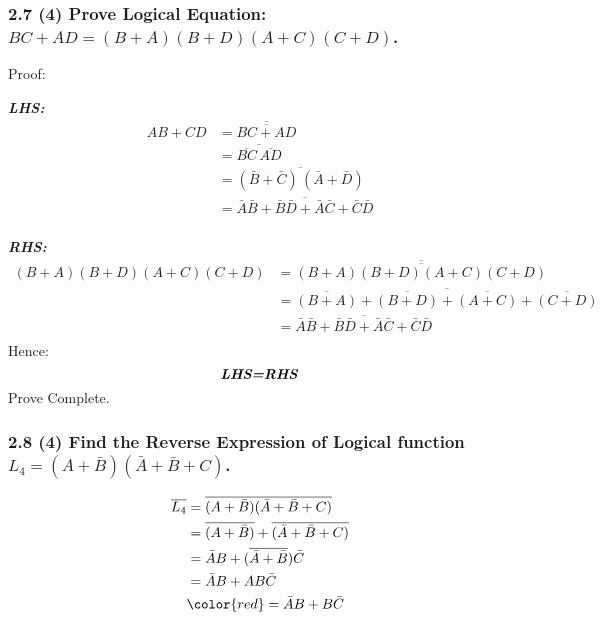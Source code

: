     \subsubsection{2.7 (4) \textnormal{Prove Logical Equation: $BC+AD=(B+A)(B+D)(A+C)(C+D)$}.} 
    {\color{hwSolution}
        \noindent Proof:

        \textbf{\textit{LHS:}}
        \begin{align*}
            AB+CD &= \overline{\overline{BC+AD}}\\
            &= \overline{\overline{BC}\,\overline{AD}}\\
            &= \overline{(\bar{B}+\bar{C})\,(\bar{A}+\bar{D})}\\
            &= \overline{\bar{A}\bar{B}+\bar{B}\bar{D}+\bar{A}\bar{C}+\bar{C}\bar{D}}\\
        \end{align*}

        \textbf{\textit{RHS:}}
        \begin{align*}
            (B+A)(B+D)(A+C)(C+D) &= \overline{\overline{(B+A)(B+D)(A+C)(C+D)}}\\
            &= \overline{\overline{(B+A)}+\overline{(B+D)}+\overline{(A+C)}+\overline{(C+D)}}\\
            &= \overline{\bar{A}\bar{B}+\bar{B}\bar{D}+\bar{A}\bar{C}+\bar{C}\bar{D}}\\
        \end{align*}
        Hence:
        \[\textbf{\textit{LHS=RHS}}\]
        Prove Complete.
    }
    \subsubsection{2.8 (4) \textnormal{Find the Reverse Expression of Logical function $L_4=(A+\bar{B})(\bar{A}+\bar{B}+C)$}.}
    {\color{hwSolution}
        \begin{align*}
            \overline{L_4} 
            &= \overline{(A+\bar{B})(\bar{A}+\bar{B}+C)}\\
            &= \overline{(A+\bar{B})}+\overline{(\bar{A}+\bar{B}+C)}\\
            &= \bar{A}B+(\overline{\bar{A}+\bar{B}})\bar{C}\\
            &= \bar{A}B+AB\bar{C}\\
            &\color{red}= \bar{A}B + B\bar{C}
        \end{align*}
    }
